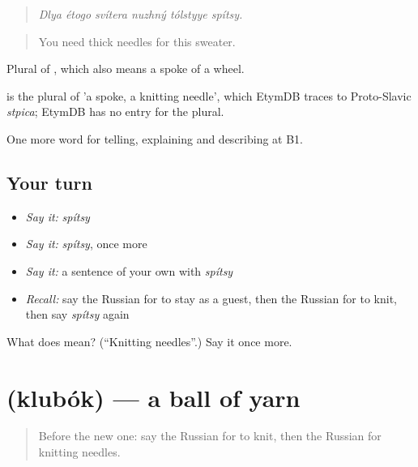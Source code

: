 \begin{quote}
\emph{Dlya étogo svítera nuzhný tólstyye spítsy.}
\end{quote}

\begin{quote}
You need thick needles for this sweater.
\end{quote}

Plural of \emph{}, which also means a spoke of a wheel.

\begin{cousinweb}
\emph{} is the plural of \emph{} 'a spoke, a knitting needle', which EtymDB traces to Proto-Slavic \emph{stpica}; EtymDB has no entry for the plural.
\end{cousinweb}

\begin{grammarlens}[title={What you've built}]
One more word for telling, explaining and describing at B1.
\end{grammarlens}

\subsection*{Your turn}
\begin{itemize}
\raggedright
  \item \emph{Say it:} \emph{spítsy}
  \item \emph{Say it:} \emph{spítsy}, once more
  \item \emph{Say it:} a sentence of your own with \emph{spítsy}
  \item \emph{Recall:} say the Russian for to stay as a guest, then the Russian for to knit, then say \emph{spítsy} again
\end{itemize}

\begin{tcolorbox}[breakable,colback=teal!4,colframe=teal!35!black,title={Before you move on}]
What does  mean? (\textquotedblleft{}Knitting needles\textquotedblright{}.) Say it once more.
\end{tcolorbox}
\section[\texorpdfstring{\ru{клубок} (klubók)}{клубок (klubók)}]{ (klubók) — a ball of yarn}

\label{lesson:RU-C500-klubok}



\begin{quote}
Before the new one: say the Russian for to knit, then the Russian for knitting needles.
\end{quote}

